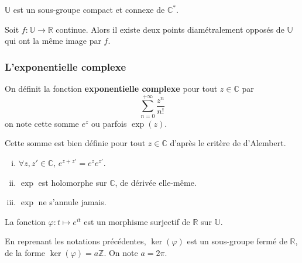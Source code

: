 	
	\begin{proposition}
		$\mathbb{U}$ est un sous-groupe compact et connexe de $\mathbb{C}^*$.
	\end{proposition}
	
	\begin{application}
		Soit $f : \mathbb{U} \rightarrow \mathbb{R}$ continue. Alors il existe deux points diamétralement opposés de $\mathbb{U}$ qui ont la même image par $f$.
	\end{application}
	
	\subsubsection{L'exponentielle complexe}
	
	
	\begin{definition}
		On définit la fonction \textbf{exponentielle complexe} pour tout $z \in \mathbb{C}$ par
		\[ \sum_{n=0}^{+\infty} \frac{z^n}{n!} \]
		on note cette somme $e^z$ ou parfois $\exp(z)$.
	\end{definition}
	
	\begin{remark}
		Cette somme est bien définie pour tout $z \in \mathbb{C}$ d'après le critère de d'Alembert.
	\end{remark}
	
	\begin{proposition}
		\begin{enumerate}[(i)]
			\item $\forall z, z' \in \mathbb{C}, \, e^{z+z'} = e^z e^{z'}$.
			\item $\exp$ est holomorphe sur $\mathbb{C}$, de dérivée elle-même.
			\item $\exp$ ne s'annule jamais.
		\end{enumerate}
	\end{proposition}
	
	\begin{proposition}
		La fonction $\varphi : t \mapsto e^{it}$ est un morphisme surjectif de $\mathbb{R}$ sur $\mathbb{U}$.
	\end{proposition}
	
	\begin{proposition}
		En reprenant les notations précédentes, $\ker(\varphi)$ est un sous-groupe fermé de $\mathbb{R}$, de la forme $\ker(\varphi) = a\mathbb{Z}$. On note $a = 2\pi$.
	\end{proposition}
	
